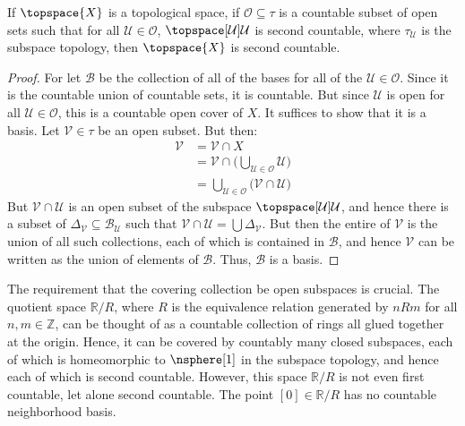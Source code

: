         \begin{theorem}
            \label{thm:Count_Open_Cover_of_Sec_Count_Implies_Sec_Count}%
            If $\topspace{X}$ is a topological space, if
            $\mathcal{O}\subseteq\tau$ is a countable subset of open sets such
            that for all $\mathcal{U}\in\mathcal{O}$,
            $\topspace[\mathcal{U}]{\mathcal{U}}$ is second countable, where
            $\tau_{\mathcal{U}}$ is the subspace topology, then $\topspace{X}$
            is second countable.
        \end{theorem}
        \begin{proof}
            For let $\mathcal{B}$ be the collection of all of the bases for all
            of the $\mathcal{U}\in\mathcal{O}$. Since it is the countable union
            of countable sets, it is countable. But since $\mathcal{U}$ is open
            for all $\mathcal{U}\in\mathcal{O}$, this is a countable open cover
            of $X$. It suffices to show that it is a basis. Let
            $\mathcal{V}\in\tau$ be an open subset. But then:
            \begin{align}
                \mathcal{V}&=\mathcal{V}\cap{X}\\
                &=\mathcal{V}\cap\Big(
                    \bigcup_{\mathcal{U}\in\mathcal{O}}\mathcal{U}
                \Big)\\
                &=\bigcup_{\mathcal{U}\in\mathcal{O}}
                    \big(\mathcal{V}\cap\mathcal{U}\big)
            \end{align}
            But $\mathcal{V}\cap\mathcal{U}$ is an open subset of the subspace
            $\topspace[\mathcal{U}]{\mathcal{U}}$, and hence there is a subset
            of $\Delta_{\mathcal{V}}\subseteq\mathcal{B}_{\mathcal{U}}$ such
            that $\mathcal{V}\cap\mathcal{U}=\bigcup\Delta_{\mathcal{V}}$. But
            then the entire of $\mathcal{V}$ is the union of all such
            collections, each of which is contained in $\mathcal{B}$, and hence
            $\mathcal{V}$ can be written as the union of elements of
            $\mathcal{B}$. Thus, $\mathcal{B}$ is a basis.
        \end{proof}
        The requirement that the covering collection be open subspaces is
        crucial. The quotient space $\mathbb{R}/R$, where $R$ is the equivalence
        relation generated by $nRm$ for all $n,m\in\mathbb{Z}$, can be thought
        of as a countable collection of rings all glued together at the origin.
        Hence, it can be covered by countably many closed subspaces, each of
        which is homeomorphic to $\nsphere[1]$ in the subspace topology, and
        hence each of which is second countable. However, this space
        $\mathbb{R}/R$ is not even first countable, let alone second countable.
        The point $[0]\in\mathbb{R}/R$ has no countable neighborhood basis.
